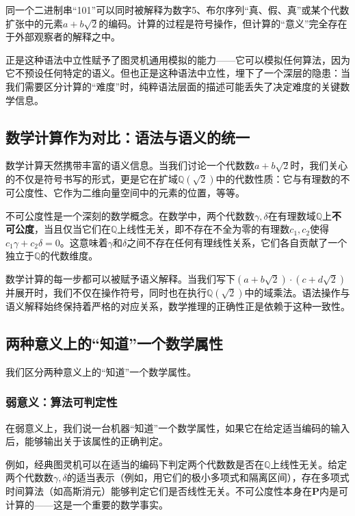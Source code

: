 \documentclass{ctexart}
\begin{document}
	同一个二进制串``101''可以同时被解释为数字5、布尔序列``真、假、真''或某个代数扩张中的元素$a+b\sqrt{2}$的编码。计算的过程是符号操作，但计算的``意义''完全存在于外部观察者的解释之中。
	
	正是这种语法中立性赋予了图灵机通用模拟的能力——它可以模拟任何算法，因为它不预设任何特定的语义。但也正是这种语法中立性，埋下了一个深层的隐患：当我们需要区分计算的``难度''时，纯粹语法层面的描述可能丢失了决定难度的关键数学信息。
	
	\subsection{数学计算作为对比：语法与语义的统一}
	
	数学计算天然携带丰富的语义信息。当我们讨论一个代数数$a + b\sqrt{2}$时，我们关心的不仅是符号书写的形式，更是它在扩域$\mathbb{Q}(\sqrt{2})$中的代数性质：它与有理数的不可公度性、它作为二维向量空间中的元素的位置，等等。
	
	不可公度性是一个深刻的数学概念。在数学中，两个代数数$\gamma, \delta$在有理数域$\mathbb{Q}$上\textbf{不可公度}，当且仅当它们在$\mathbb{Q}$上线性无关，即不存在不全为零的有理数$c_1, c_2$使得$c_1\gamma + c_2\delta = 0$。这意味着$\gamma$和$\delta$之间不存在任何有理线性关系，它们各自贡献了一个独立于$\mathbb{Q}$的代数维度。
	
	数学计算的每一步都可以被赋予语义解释。当我们写下$(a + b\sqrt{2}) \cdot (c + d\sqrt{2})$并展开时，我们不仅在操作符号，同时也在执行$\mathbb{Q}(\sqrt{2})$中的域乘法。语法操作与语义解释始终保持着严格的对应关系，数学推理的正确性正是依赖于这种一致性。
	
	\subsection{两种意义上的``知道''一个数学属性}
	
	我们区分两种意义上的``知道''一个数学属性。
	
	\subsubsection{弱意义：算法可判定性}
	
	在弱意义上，我们说一台机器``知道''一个数学属性，如果它在给定适当编码的输入后，能够输出关于该属性的正确判定。
	
	例如，经典图灵机可以在适当的编码下判定两个代数数是否在$\mathbb{Q}$上线性无关。给定两个代数数$\gamma, \delta$的适当表示（例如，用它们的极小多项式和隔离区间），存在多项式时间算法（如高斯消元）能够判定它们是否线性无关。不可公度性本身在$\mathbf{P}$内是可计算的——这是一个重要的数学事实。
	
\end{document}
